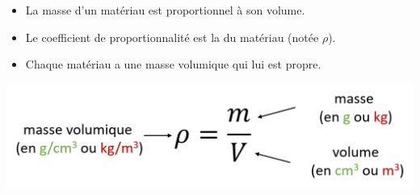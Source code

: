 \begin{mybilan}
	\begin{itemize}
		\item La masse d'un matériau est proportionnel à son volume.
		\item Le coefficient de proportionnalité est la  du matériau (notée $\rho$).
		
		\item Chaque matériau a une masse volumique qui lui est propre.
	\end{itemize}

	\begin{center}
		\includegraphics[scale=0.5]{img/masse_vol}
	\end{center}
\end{mybilan}